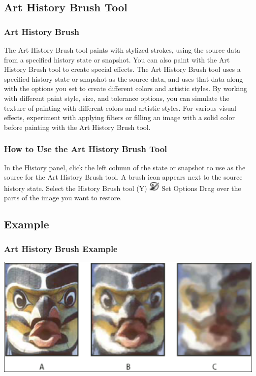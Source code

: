 \documentclass{beamer}
\begin{document}
\subsection{Art History Brush Tool}		

\begin{frame}
	\frametitle{Art History Brush}
	\begin{outline}
		\1 The Art History Brush tool paints with stylized strokes, using the source data from a specified history state or snapshot.
		\1 You can also paint with the Art History Brush tool to create special effects.
		\1 The Art History Brush tool uses a specified history state or snapshot as the source data, and uses that data along with the options you set to create different colors and artistic styles.
		\1 By working with different paint style, size, and tolerance options, you can simulate the texture of painting with different colors and artistic styles.
		\1 For various visual effects, experiment with applying filters or filling an image with a solid color before painting with the Art History Brush tool. 
	\end{outline}
\end{frame}

\begin{frame}
	\frametitle{How to Use the Art History Brush Tool}
	\begin{outline}
		\1 In the History panel, click the left column of the state or snapshot to use as the source for the Art History Brush tool. 
		\2 A brush icon appears next to the source history state.
		\1 Select the History Brush tool (Y) \includegraphics[width=0.04\textwidth]{images/P_HistoryArtBrush_Lg_N.png}
		\1 Set Options
		\1 Drag over the parts of the image you want to restore.
	\end{outline}
\end{frame}

\subsection{Example}		
\begin{frame}
	\frametitle{Art History Brush Example}
	\begin{center}
		\includegraphics[width=1.0\textwidth]{images/art history brush example.png}
	\end{center}
\end{frame}
\end{document}
